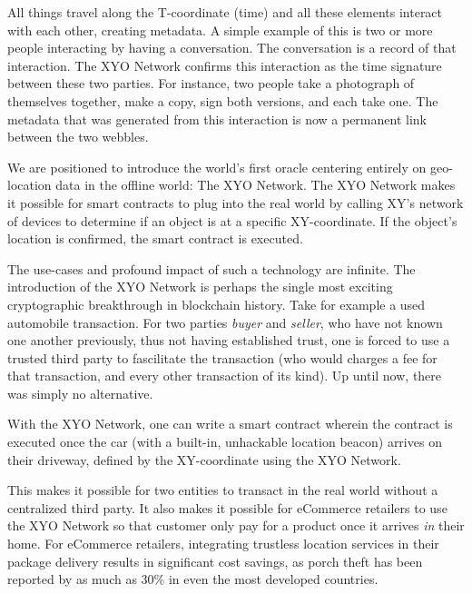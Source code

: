 \documentclass{article}
\begin{document}
All things travel along the T-coordinate (time) and all these elements interact with each other, creating metadata. A simple example of this is two or more people interacting by having a conversation. The conversation is a record of that interaction. The XYO Network confirms this interaction as the time signature between these two parties. For instance, two people take a photograph of themselves together, make a copy, sign both versions, and each take one. The metadata that was generated from this interaction is now a permanent link between the two \Glspl{webble}.

We are positioned to introduce the world's first oracle centering entirely on geo-location data in the offline world: The XYO Network. The XYO Network makes it possible for smart contracts to plug into the real world by calling XY's network of devices to determine if an object is at a specific XY-coordinate. If the object’s location is confirmed, the smart contract is executed. 

The use-cases and profound impact of such a technology are infinite. The introduction of the XYO Network is perhaps the single most exciting cryptographic breakthrough in blockchain history. Take for example a used automobile transaction. For two parties \textit{buyer} and \textit{seller}, who have not known one another previously, thus not having established trust, one is forced to use a trusted third party to fascilitate the transaction (who would charges a fee for that transaction, and every other transaction of its kind). Up until now, there was simply no alternative. 

With the XYO Network, one can write a smart contract wherein the contract is executed once the car (with a built-in, unhackable location beacon) arrives on their driveway, defined by the XY-coordinate using the XYO Network.

This makes it possible for two entities to transact in the real world without a centralized third party. It also makes it possible for eCommerce retailers to use the XYO Network so that customer only pay for a product once it arrives \textit{in} their home. For eCommerce retailers, integrating trustless location services in their package delivery results in significant cost savings, as porch theft has been reported by as much as 30\% in even the most developed countries.
\end{document}
